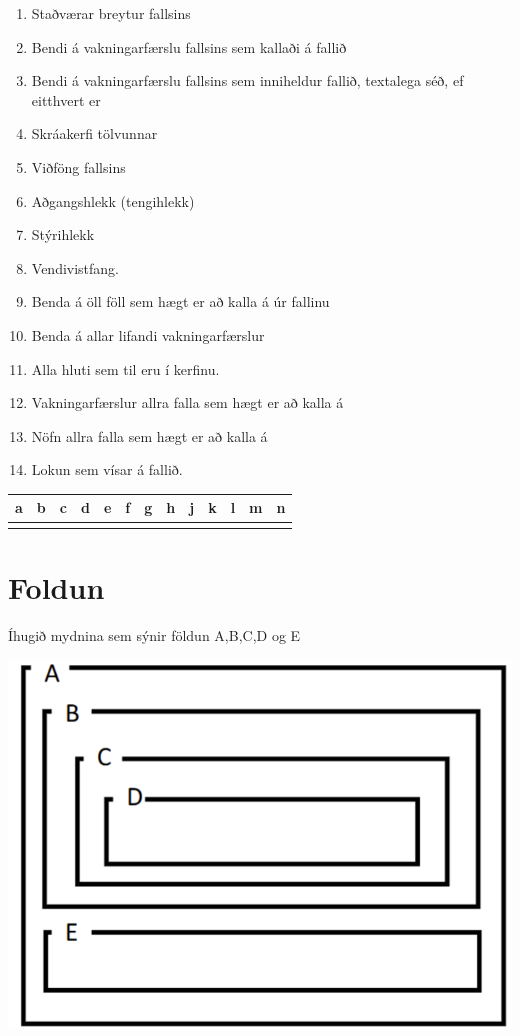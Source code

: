 \documentclass{article}
\newcommand{\bo}[1]{\textbf{#1}}
\newcommand{\enum}{\begin{enumerate}[label = \alph*.]}
\begin{document}
\enum
\item Staðværar breytur fallsins
\item Bendi á vakningarfærslu fallsins sem kallaði á fallið
\item Bendi á vakningarfærslu fallsins sem inniheldur fallið, textalega
séð, ef eitthvert er
\item Skráakerfi tölvunnar
\item Viðföng fallsins
\item Aðgangshlekk (tengihlekk)
\item Stýrihlekk
\item Vendivistfang.
\item Benda á öll föll sem hægt er að kalla á úr fallinu
\item Benda á allar lifandi vakningarfærslur
\item Alla hluti sem til eru í kerfinu.
\item Vakningarfærslur allra falla sem hægt er að kalla á
\item Nöfn allra falla sem hægt er að kalla á
\item Lokun sem vísar á fallið.
\end{enumerate}


\begin{tabularx}{\textwidth}{|X|X|X|X|X|X|X|X|X|X|X|X|X|}
    \hline
    \bo{a} & \bo{b} & \bo{c} & \bo{d} & \bo{e} & \bo{f} & \bo{g} & \bo{h} & \bo{j} & \bo{k} & \bo{l} & \bo{m} & \bo{n} \\ \hline
     & & & & & & & & & & & & \\ \hline
\end{tabularx}

\newpage

\section{Foldun}

Íhugið mydnina sem sýnir földun A,B,C,D og E

\includegraphics[scale = 1 ]{myndir/AbcdFoldun.png}
\end{document}
